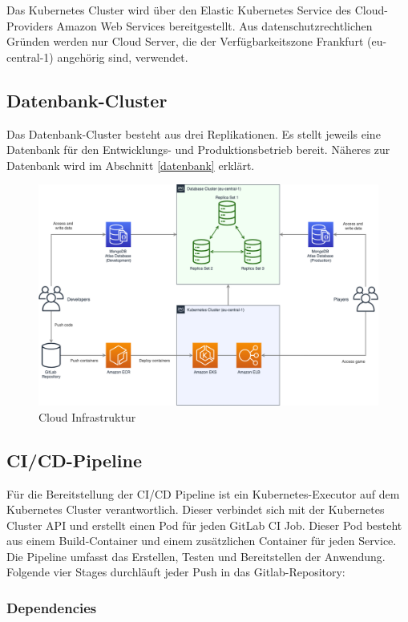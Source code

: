 \documentclass[letterpaper, 10 pt, conference]{ieeeconf}
\begin{document}
Das Kubernetes Cluster wird über den Elastic Kubernetes Service des Cloud-Providers Amazon Web Services bereitgestellt.  Aus datenschutzrechtlichen Gründen werden nur Cloud Server, die der Verfügbarkeitszone Frankfurt (eu-central-1) angehörig sind, verwendet.

\subsection{Datenbank-Cluster}
Das Datenbank-Cluster besteht aus drei Replikationen. Es stellt jeweils eine Datenbank für den Entwicklungs- und Produktionsbetrieb bereit. Näheres zur Datenbank wird im Abschnitt \ref{datenbank} erklärt.

\begin{figure}[thpb]
      \centering
      \includegraphics[scale=0.22]{images/infrastructure}
      \caption{Cloud Infrastruktur}
      \label{fig:infrastructure}
\end{figure}


\subsection{CI/CD-Pipeline}

Für die Bereitstellung der CI/CD Pipeline ist ein Kubernetes-Executor\cite{c1} auf dem Kubernetes Cluster verantwortlich.  Dieser verbindet sich mit der Kubernetes Cluster API und erstellt einen Pod für jeden GitLab CI Job. Dieser Pod besteht aus einem Build-Container und einem zusätzlichen Container für jeden Service. Die Pipeline umfasst das Erstellen, Testen und Bereitstellen der Anwendung.  Folgende vier Stages durchläuft jeder Push in das Gitlab-Repository:

\subsubsection{Dependencies}
\end{document}
